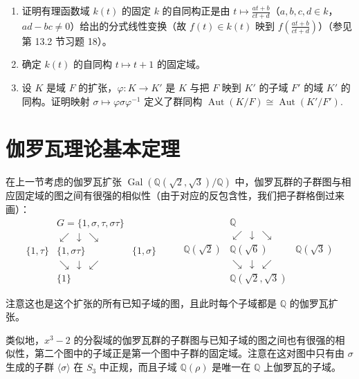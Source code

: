 \begin{enumerate}
（c）证明 \(\mathbb{R}\) 上任何在 \(\mathbb{Q}\) 上为恒等的连续映射是恒等映射，故 \(\operatorname{Aut}(\mathbb{R}/\mathbb{Q}) = 1\).

\item 证明有理函数域 \(k(t)\) 的固定 \(k\) 的自同构正是由 \(t \mapsto \frac{at+b}{ct+d}\)（\(a, b, c, d \in k\)，\(ad-bc \neq 0\)）给出的分式线性变换（故 \(f(t) \in k(t)\) 映到 \(f\left(\frac{at+b}{ct+d}\right)\)）（参见第 13.2 节习题 18）。

\item 确定 \(k(t)\) 的自同构 \(t \mapsto t+1\) 的固定域。

\item 设 \(K\) 是域 \(F\) 的扩张，\(\varphi : K \to K'\) 是 \(K\) 与把 \(F\) 映到 \(K'\) 的子域 \(F'\) 的域 \(K'\) 的同构。证明映射 \(\sigma \mapsto \varphi\sigma\varphi^{-1}\) 定义了群同构 \(\operatorname{Aut}(K/F) \cong \operatorname{Aut}(K'/F')\).
\end{enumerate}

\section{伽罗瓦理论基本定理}

在上一节考虑的伽罗瓦扩张 \(\operatorname{Gal}(\mathbb{Q}(\sqrt{2}, \sqrt{3})/\mathbb{Q})\) 中，伽罗瓦群的子群图与相应固定域的图之间有很强的相似性（由于对应的反包含性，我们把子群格倒过来画）：
\[
\begin{array}{ccc}
& G = \{1, \sigma, \tau, \sigma\tau\} & \\
& \swarrow\ \downarrow\ \searrow & \\
\{1, \tau\} & \{1, \sigma\tau\} & \{1, \sigma\}\\
& \searrow\ \downarrow\ \swarrow & \\
& \{1\} &
\end{array}
\qquad
\begin{array}{ccc}
& \mathbb{Q} & \\
& \swarrow\ \downarrow\ \searrow & \\
\mathbb{Q}(\sqrt{2}) & \mathbb{Q}(\sqrt{6}) & \mathbb{Q}(\sqrt{3})\\
& \searrow\ \downarrow\ \swarrow & \\
& \mathbb{Q}(\sqrt{2}, \sqrt{3}) &
\end{array}
\]

注意这也是这个扩张的所有已知子域的图，且此时每个子域都是 \(\mathbb{Q}\) 的伽罗瓦扩张。

类似地，\(x^3-2\) 的分裂域的伽罗瓦群的子群图与已知子域的图之间也有很强的相似性，第二个图中的子域正是第一个图中子群的固定域。注意在这对图中只有由 \(\sigma\) 生成的子群 \(\langle \sigma \rangle\) 在 \(S_3\) 中正规，而且子域 \(\mathbb{Q}(\rho)\) 是唯一在 \(\mathbb{Q}\) 上伽罗瓦的子域。


